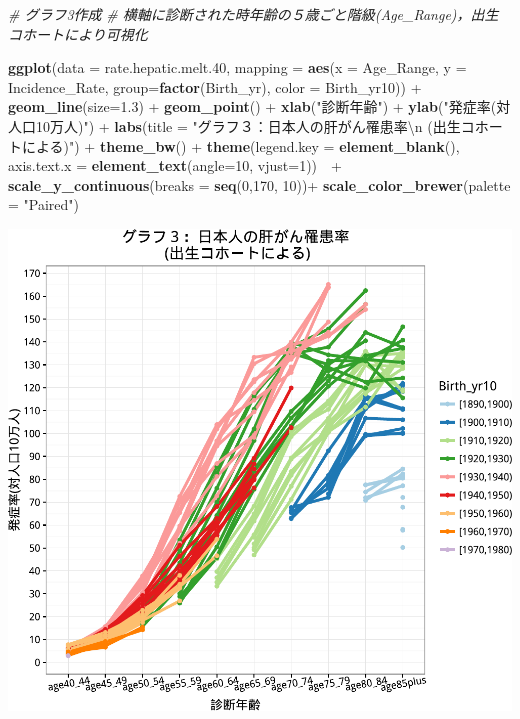 \documentclass[11pt,]{article}
\newenvironment{Shaded}{\begin{snugshade}}{\end{snugshade}}
\newcommand{\KeywordTok}[1]{\textcolor[rgb]{0.13,0.29,0.53}{\textbf{{#1}}}}
\newcommand{\DataTypeTok}[1]{\textcolor[rgb]{0.13,0.29,0.53}{{#1}}}
\newcommand{\DecValTok}[1]{\textcolor[rgb]{0.00,0.00,0.81}{{#1}}}
\newcommand{\FloatTok}[1]{\textcolor[rgb]{0.00,0.00,0.81}{{#1}}}
\newcommand{\CharTok}[1]{\textcolor[rgb]{0.31,0.60,0.02}{{#1}}}
\newcommand{\StringTok}[1]{\textcolor[rgb]{0.31,0.60,0.02}{{#1}}}
\newcommand{\CommentTok}[1]{\textcolor[rgb]{0.56,0.35,0.01}{\textit{{#1}}}}
\newcommand{\NormalTok}[1]{{#1}}
\begin{document}
\begin{Shaded}
\begin{Highlighting}[]
\CommentTok{#  グラフ3作成}
\CommentTok{#  横軸に診断された時年齢の５歳ごと階級(Age_Range)，出生コホートにより可視化}


\KeywordTok{ggplot}\NormalTok{(}\DataTypeTok{data =} \NormalTok{rate.hepatic.melt}\FloatTok{.40}\NormalTok{,}
       \DataTypeTok{mapping =} \KeywordTok{aes}\NormalTok{(}\DataTypeTok{x =} \NormalTok{Age_Range, }\DataTypeTok{y =} \NormalTok{Incidence_Rate, }\DataTypeTok{group=}\KeywordTok{factor}\NormalTok{(Birth_yr),}
                     \DataTypeTok{color =} \NormalTok{Birth_yr10)) +}\StringTok{ }
\StringTok{  }\KeywordTok{geom_line}\NormalTok{(}\DataTypeTok{size=}\FloatTok{1.3}\NormalTok{) +}
\StringTok{  }\KeywordTok{geom_point}\NormalTok{() +}
\StringTok{    }\KeywordTok{xlab}\NormalTok{(}\StringTok{"診断年齢"}\NormalTok{) +}\StringTok{ }
\StringTok{    }\KeywordTok{ylab}\NormalTok{(}\StringTok{"発症率(対人口10万人)"}\NormalTok{) +}\StringTok{ }
\StringTok{    }\KeywordTok{labs}\NormalTok{(}\DataTypeTok{title =} 
           \StringTok{"グラフ３：日本人の肝がん罹患率}\CharTok{\textbackslash{}n}\StringTok{ (出生コホートによる)"}\NormalTok{) +}\StringTok{ }
\StringTok{    }\KeywordTok{theme_bw}\NormalTok{() +}
\StringTok{    }\KeywordTok{theme}\NormalTok{(}\DataTypeTok{legend.key =} \KeywordTok{element_blank}\NormalTok{(),}
          \DataTypeTok{axis.text.x =} \KeywordTok{element_text}\NormalTok{(}\DataTypeTok{angle=}\DecValTok{10}\NormalTok{, }\DataTypeTok{vjust=}\DecValTok{1}\NormalTok{))　+}\StringTok{ }
\StringTok{  }\KeywordTok{scale_y_continuous}\NormalTok{(}\DataTypeTok{breaks =} \KeywordTok{seq}\NormalTok{(}\DecValTok{0}\NormalTok{,}\DecValTok{170}\NormalTok{, }\DecValTok{10}\NormalTok{))+}
\StringTok{  }\KeywordTok{scale_color_brewer}\NormalTok{(}\DataTypeTok{palette =} \StringTok{"Paired"}\NormalTok{)}
\end{Highlighting}
\end{Shaded}

\includegraphics{example_files/figure-latex/unnamed-chunk-6-1.pdf}

\hypertarget{refs}{}
\end{document}

